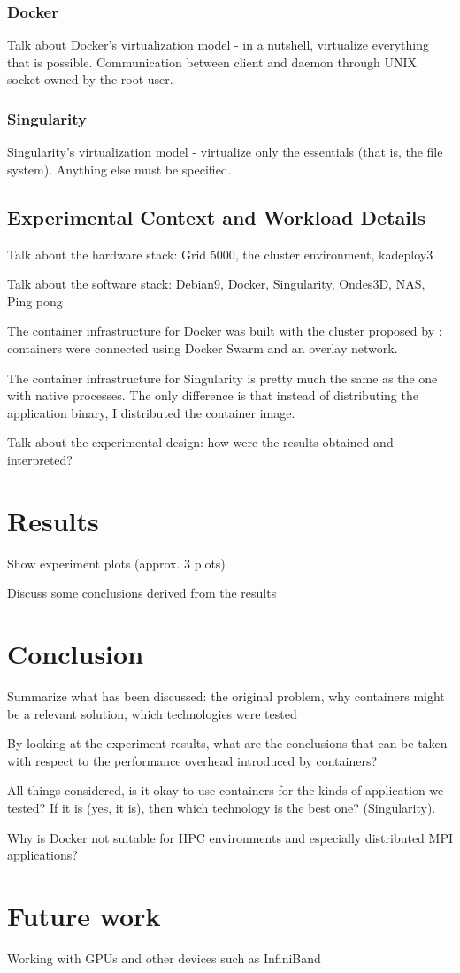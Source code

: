 \documentclass[12pt]{article}
\begin{document}
\subsubsection{Docker}
Talk about Docker's virtualization model - in a nutshell, virtualize everything that is possible. Communication between client and daemon through UNIX socket owned by the root user.

\subsubsection{Singularity}
Singularity's virtualization model - virtualize only the essentials (that is, the file system). Anything else must be specified.

\subsection{Experimental Context and Workload Details}
Talk about the hardware stack: Grid 5000, the cluster environment, kadeploy3

Talk about the software stack: Debian9, Docker, Singularity, Ondes3D, NAS, Ping pong

The container infrastructure for Docker was built with the cluster proposed by \cite{7868429}: containers were connected using Docker Swarm and an overlay network.

The container infrastructure for Singularity is pretty much the same as the one with native processes. The only difference is that instead of distributing the application binary, I distributed the container image.

Talk about the experimental design: how were the results obtained and interpreted?

\section{Results}
Show experiment plots (approx. 3 plots)

Discuss some conclusions derived from the results

\section{Conclusion}
Summarize what has been discussed: the original problem, why containers might be a relevant solution, which technologies were tested

By looking at the experiment results, what are the conclusions that can be taken with respect to the performance overhead introduced by containers?

All things considered, is it okay to use containers for the kinds of application we tested? If it is (yes, it is), then which technology is the best one? (Singularity).

Why is Docker not suitable for HPC environments and especially distributed MPI applications? 

\section{Future work}
Working with GPUs and other devices such as InfiniBand



\end{document}
